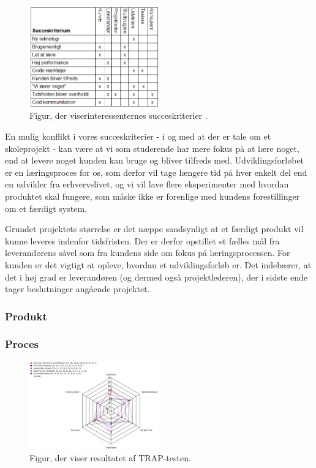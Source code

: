 \documentclass[12pt, a4paper]{report}
\begin{document}
\begin{figure}[ht!]
  \includegraphics[width=0.5\textwidth]{succeskriterium}
  \caption{Figur, der viserinteressenternes succeskriterier .}
\end{figure}

En mulig konflikt i vores succeskriterier - i og med at der er tale om et skoleprojekt - kan være at vi som studerende har mere fokus på at lære noget, end at levere noget kunden kan bruge og bliver tilfreds med. Udviklingsforløbet er en læringsproces for os, som derfor vil tage længere tid på hver enkelt del end en udvikler fra erhvervslivet, og vi vil lave flere eksperimenter med hvordan produktet skal fungere, som måske ikke er forenlige med kundens forestillinger om et færdigt system.

Grundet projektets størrelse er det næppe sandsynligt at et færdigt produkt vil kunne leveres indenfor tidsfristen. Der er derfor opstillet et fælles mål fra leverandørens såvel som fra kundens side om fokus på læringsprocessen. For kunden er det vigtigt at opleve, hvordan et udviklingsforløb er. Det indebærer, at det i høj grad er leverandøren (og dermed også projektlederen), der i sidste ende tager beslutninger angående projektet.


\subsubsection{Produkt}

\subsubsection{Proces}

\begin{figure}[ht!]
\includegraphics[width=0.5\textwidth]{itsaTRAP}
\caption{Figur, der viser resultatet af TRAP-testen.}
\label{trap}
\end{figure}
\end{document}
